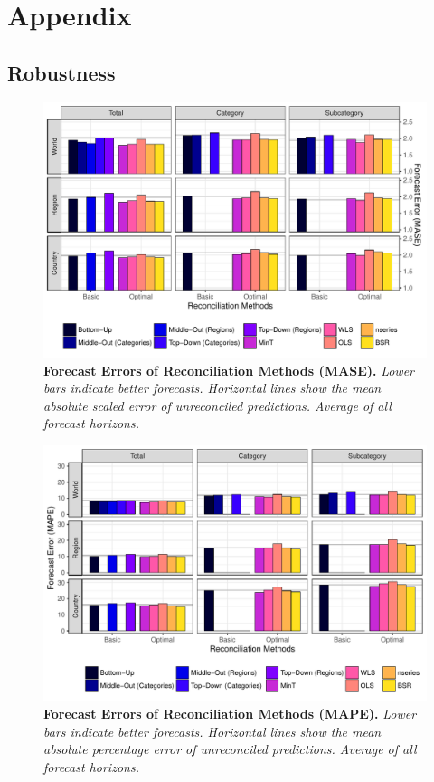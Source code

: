 
\appendix
\section{Appendix}

\subsection{Robustness}
\label{sec:robust}

\begin{figure}[H]
	\includegraphics[width=\textwidth]{fig/fig_eval_mase}
	\caption[Forecast Errors of Reconciliation Methods]{\textbf{Forecast Errors of Reconciliation Methods (MASE).} \textit{Lower bars indicate better forecasts. Horizontal lines show the mean absolute scaled error of unreconciled predictions. Average of all forecast horizons.}}\label{fig:mase}
\end{figure}

\begin{figure}[H]
	\includegraphics[width=\textwidth]{fig/fig_eval_mape}
	\caption[Forecast Errors of Reconciliation Methods]{\textbf{Forecast Errors of Reconciliation Methods (MAPE).} \textit{Lower bars indicate better forecasts. Horizontal lines show the mean absolute percentage error of unreconciled predictions. Average of all forecast horizons.}}\label{fig:mape}
\end{figure}

